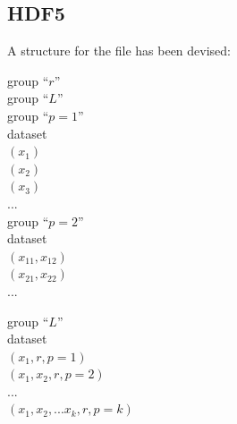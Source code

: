 \documentclass[12pt]{article}
\begin{document}
\subsection{HDF5}
A structure for the file has been devised:
\begin{tabbing}
	\hspace{5mm} group ``$r$'' \\
		\hspace{10mm} group ``$L$'' \\
		\hspace{15mm} group ``$p=1$'' \\
				\hspace{20mm} dataset \\
					\hspace{25mm} $ (x_{1})$ \\
					\hspace{25mm} $ (x_{2})$ \\
					\hspace{25mm} $ (x_{3})$ \\
					\hspace{25mm} ... \\	
			\hspace{15mm} group ``$p=2$'' \\
				\hspace{20mm} dataset \\
					\hspace{25mm}                           $(x_{11},x_{12})$ \\
					\hspace{25mm} $(x_{21},x_{22})$ \\
					\hspace{25mm} ... \\
\end{tabbing}

\begin{tabbing}
  \hspace{5mm} group ``$L$'' \\
  \hspace{10mm} dataset \\
  \hspace{15mm} $ (x_{1}, r, p=1)$ \\
  \hspace{15mm} $ (x_{1},x_2, r, p=2)$ \\
  \hspace{15mm} ... \\
  \hspace{15mm} $ (x_{1},x_2,...x_k, r, p=k)$ \\
\end{tabbing}
\end{document}
